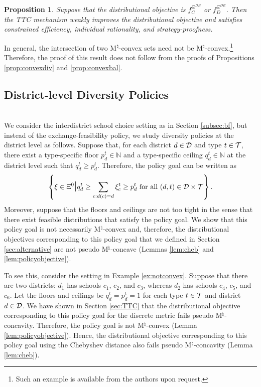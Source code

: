 \documentclass[12pt]{amsart}
\newtheorem{proposition}{Proposition}
\theoremstyle{remark}
\begin{document}
\begin{proposition}\label{prop:mix}
Suppose that the distributional objective is $f_C^{\Xi^{DE}}$ or $f_D^{\Xi^{DE}}$. Then the TTC mechanism weakly improves the distributional objective and satisfies constrained efficiency, individual rationality, and strategy-proofness.
\end{proposition}

In general, the intersection of two M$^{\natural}$-convex sets need not be M$^{\natural}$-convex.\footnote{Such
an example is available from the authors upon request.} Therefore, the proof of this result
does not follow from the proofs of Propositions \ref{prop:convexdiv} and \ref{prop:convexbal}.

\subsection{District-level Diversity Policies}\hfill\\
We consider the interdistrict school choice setting as in Section \ref{subsec:bf}, but instead of the
exchange-feasibility policy, we study diversity policies at the district level as follows. Suppose that,
for each district $d \in \mathcal{D}$ and type $t \in \mathcal{T}$, there exist a type-specific floor $p_d^t\in \mathbb N$
and a type-specific ceiling $q_d^t\in \mathbb N$ at the district level such that $q_d^t \geq p_d^t$. Therefore, the policy goal can be written as
\[\left \{\xi \in \Xi^0 \mathlarger{\mathlarger{\mid}} q_d^t \geq  \sum_{c:d(c)=d} \xi_c^t \geq p_d^t \text{ for all } (d,t)\in \cald \times \calt \right \}.\]
Moreover, suppose that the floors and ceilings are not too tight in the sense that there exist feasible distributions that satisfy the policy goal.
We show that this policy goal is not necessarily M$^{\natural}$-convex and, therefore, the distributional objectives
corresponding to this policy goal that we defined in Section \ref{sec:alternative} are not pseudo M$^{\natural}$-concave
(Lemmas \ref{lem:cheb} and \ref{lem:policyobjective}).

To see this, consider the setting in Example \ref{ex:notconvex}. Suppose that there are two districts: $d_1$ has schools $c_1$, $c_2$, and $c_3$,
whereas $d_2$ has schools $c_4$, $c_5$, and $c_6$. Let the floors and ceilings be $q_d^t = p_d^t = 1$ for each type $t\in \mathcal{T}$ and district $d\in \mathcal{D}$.
We have shown in Section \ref{sec:TTC} that the distributional objective corresponding to this policy goal for the discrete metric
fails pseudo M$^{\natural}$-concavity. Therefore, the policy goal is not M$^{\natural}$-convex (Lemma \ref{lem:policyobjective}).
Hence, the distributional objective corresponding to this policy goal using the Chebyshev distance also fails pseudo M$^{\natural}$-concavity (Lemma \ref{lem:cheb}).
\end{document}
